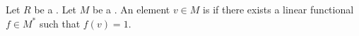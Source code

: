 \begin{definition} \label{definition:unimodular_element_of_a_module_over_a_ring}
    Let $R$ be a . Let $M$ be a .
    An element $v \in M$ is  if there exists a linear functional $f \in M^*$  such that $f(v) = 1$.
\end{definition}